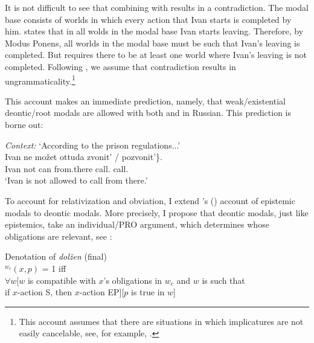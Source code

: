 \documentclass[output=paper,
modfonts,
newtxmath,colorlinks,citecolor=brown
]{langscibook}
\begin{document}
\ea \label{mb} 
 	\z \z 

\noindent It is not difficult to see that combining  with  results in a contradiction. The modal base consists of worlds in which every action that Ivan starts is completed by him.  states that in all wolds in the modal base Ivan starts leaving. Therefore, by Modus Ponens, all worlds in the modal base must be such that Ivan's leaving is completed. But  requires there to be at least one world where Ivan's leaving is not completed. Following \citet{gaj02}, we assume that contradiction results in ungrammaticality.\footnote{This account assumes that there are situations in which implicatures are not easily cancelable,  see, for example, \cite{mag09,mag11}.
}

This account makes an immediate prediction, namely, that weak/existential deontic/root modals are allowed with both \im and \p in Russian. This prediction is borne out:

\ea \textit{Context:} `According to the prison regulations...' \\
    \gll Ivan ne mo\v zet ottuda \minsp{\{} zvonit' / pozvonit'\}. \\
	Ivan not can from.there {} {call.\im} {} {call.\p} {} \\
	\glt `Ivan is not allowed to call from there.' \label{existdeon}
	\z 

\noindent To account for relativization and obviation, I extend \citeauthor{ste07a}'s (\citeyear{ste07a}) account of epistemic modals to deontic modals. More precisely, I propose that deontic modals, just like epistemics, take an individual/PRO argument, which determines whose obligations are relevant, see :

\ea Denotation of \textit{dolžen} (final) \\
	$^{w_c}(x,p)$ = 1 iff \\
    $\forall w$[$w$ is compatible with $x$'s obligations in $w_c$ and $w$ is such that \\
    if $x$-action S, then $x$-action EP][$p$ is true in $w$]  \label{sxdolzhenfinal}
        \z
        
\end{document}
